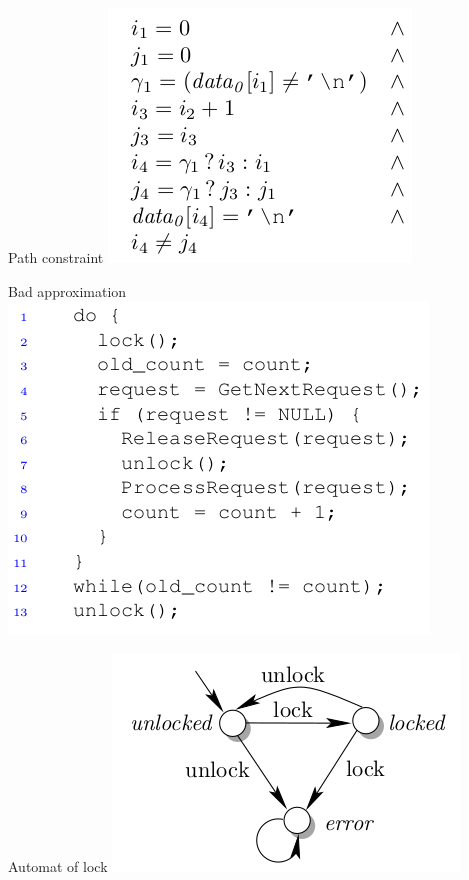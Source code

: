 \documentclass{beamer}
\begin{document}
\begin{frame}{Path constraint}
\includegraphics[scale=0.5]{path_constraint3.png}
\end{frame}

\begin{frame}{Bad approximation}
\includegraphics[scale=0.5]{example3.png}
\end{frame}

\begin{frame}{Automat of lock}
\includegraphics[scale=0.5]{lock_automaton.png}
\end{frame}
\end{document}
